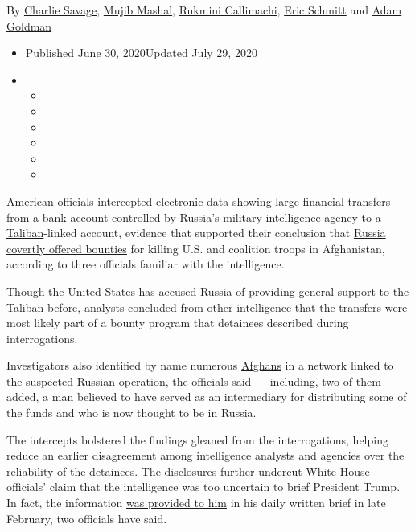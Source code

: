 By \href{https://www.nytimes.com/by/charlie-savage}{Charlie Savage},
\href{https://www.nytimes.com/by/mujib-mashal}{Mujib Mashal},
\href{https://www.nytimes.com/by/rukmini-callimachi}{Rukmini
Callimachi}, \href{https://www.nytimes.com/by/eric-schmitt}{Eric
Schmitt} and \href{https://www.nytimes.com/by/adam-goldman}{Adam
Goldman}

\begin{itemize}
\item
  Published June 30, 2020Updated July 29, 2020
\item
  \begin{itemize}
  \item
  \item
  \item
  \item
  \item
  \item
  \end{itemize}
\end{itemize}

American officials intercepted electronic data showing large financial
transfers from a bank account controlled by
\href{https://www.nytimes.com/2020/07/13/world/asia/russia-taliban-afghanistan.html}{Russia's}
military intelligence agency to a
\href{https://www.nytimes.com/2020/07/13/world/asia/russia-taliban-afghanistan.html}{Taliban}-linked
account, evidence that supported their conclusion that
\href{https://www.nytimes.com/2020/07/29/us/politics/trump-putin-bounties.html}{Russia
covertly offered bounties} for killing U.S. and coalition troops in
Afghanistan, according to three officials familiar with the
intelligence.

Though the United States has accused
\href{https://www.nytimes.com/2020/07/01/us/politics/trump-putin-russia-taliban-bounty.html}{Russia}
of providing general support to the Taliban before, analysts concluded
from other intelligence that the transfers were most likely part of a
bounty program that detainees described during interrogations.

Investigators also identified by name numerous
\href{https://www.nytimes.com/2020/07/01/world/asia/afghan-russia-bounty-middleman.html}{Afghans}
in a network linked to the suspected Russian operation, the officials
said --- including, two of them added, a man believed to have served as
an intermediary for distributing some of the funds and who is now
thought to be in Russia.

The intercepts bolstered the findings gleaned from the interrogations,
helping reduce an earlier disagreement among intelligence analysts and
agencies over the reliability of the detainees. The disclosures further
undercut White House officials' claim that the intelligence was too
uncertain to brief President Trump. In fact, the information
\href{https://www.nytimes.com/2020/06/29/us/politics/russian-bounty-trump.html}{was
provided to him} in his daily written brief in late February, two
officials have said.

